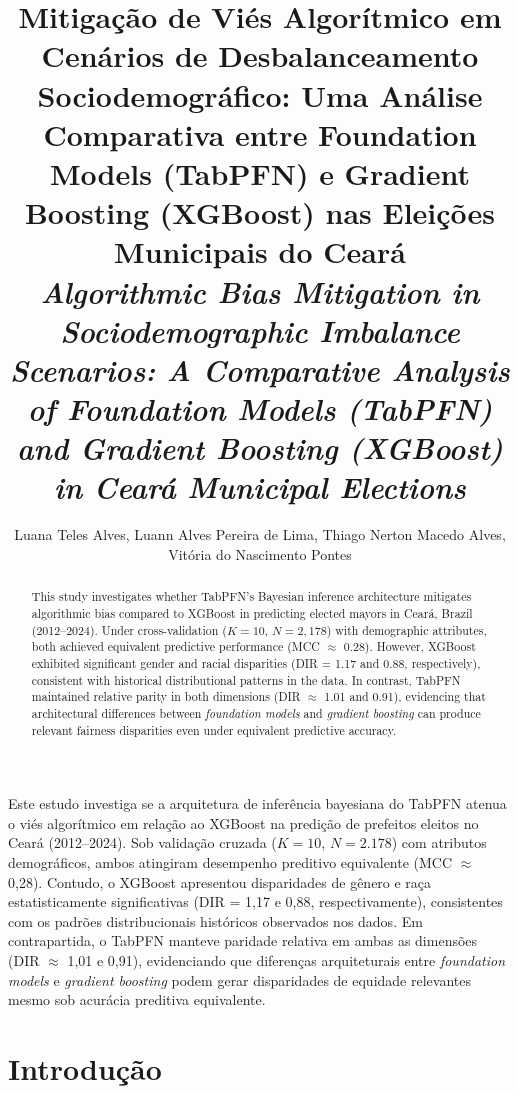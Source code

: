 \documentclass[12pt]{article}
\title{Mitigação de Viés Algorítmico em Cenários de Desbalanceamento Sociodemográfico: Uma Análise Comparativa entre Foundation Models (TabPFN) e Gradient Boosting (XGBoost) nas Eleições Municipais do Ceará \\
\medskip
\small{
    \textit{Algorithmic Bias Mitigation in Sociodemographic Imbalance Scenarios: A Comparative Analysis of Foundation Models (TabPFN) and Gradient Boosting (XGBoost) in Ceará Municipal Elections}
}
}
\author{Luana Teles Alves\inst{1}, Luann Alves Pereira de Lima\inst{1}, Thiago Nerton Macedo Alves\inst{1},\\ Vitória do Nascimento Pontes\inst{1}}
\begin{document}
 

\maketitle

\thispagestyle{plain}


\begin{abstract}
  This study investigates whether TabPFN's Bayesian inference architecture mitigates algorithmic bias compared to XGBoost in predicting elected mayors in Ceará, Brazil (2012--2024). Under cross-validation ($K=10$, $N=2{,}178$) with demographic attributes, both achieved equivalent predictive performance (MCC $\approx$ 0.28). However, XGBoost exhibited significant gender and racial disparities (DIR = 1.17 and 0.88, respectively), consistent with historical distributional patterns in the data. In contrast, TabPFN maintained relative parity in both dimensions (DIR $\approx$ 1.01 and 0.91), evidencing that architectural differences between \textit{foundation models} and \textit{gradient boosting} can produce relevant fairness disparities even under equivalent predictive accuracy.
\end{abstract}

\begin{resumo}
  Este estudo investiga se a arquitetura de inferência bayesiana do TabPFN atenua o viés algorítmico em relação ao XGBoost na predição de prefeitos eleitos no Ceará (2012--2024). Sob validação cruzada ($K=10$, $N=2.178$) com atributos demográficos, ambos atingiram desempenho preditivo equivalente (MCC $\approx$ 0,28). Contudo, o XGBoost apresentou disparidades de gênero e raça estatisticamente significativas (DIR = 1,17 e 0,88, respectivamente), consistentes com os padrões distribucionais históricos observados nos dados. Em contrapartida, o TabPFN manteve paridade relativa em ambas as dimensões (DIR $\approx$ 1,01 e 0,91), evidenciando que diferenças arquiteturais entre \textit{foundation models} e \textit{gradient boosting} podem gerar disparidades de equidade relevantes mesmo sob acurácia preditiva equivalente.
\end{resumo}

\section{Introdução}
\end{document}
